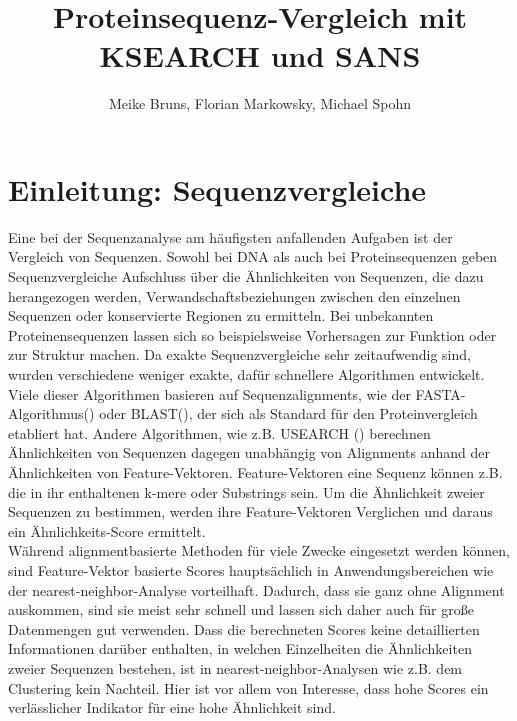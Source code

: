 \documentclass{article}
\title{Proteinsequenz-Vergleich mit KSEARCH und SANS}
\author{Meike Bruns, Florian Markowsky, Michael Spohn}
\begin{document}
\maketitle
\thispagestyle{empty}
\begin{abstract}
\end{abstract}
\newpage

\tableofcontents
\thispagestyle{empty}
\newpage

\section{Einleitung: Sequenzvergleiche}

Eine bei der Sequenzanalyse am häufigsten anfallenden Aufgaben ist der Vergleich von Sequenzen. Sowohl bei DNA als auch bei Proteinsequenzen geben Sequenzvergleiche Aufschluss über die Ähnlichkeiten von Sequenzen, die dazu herangezogen werden, Verwandschaftsbeziehungen zwischen den einzelnen Sequenzen oder konservierte Regionen zu ermitteln. Bei unbekannten Proteinensequenzen lassen sich so beispielsweise Vorhersagen zur Funktion oder zur Struktur machen. Da exakte Sequenzvergleiche sehr zeitaufwendig sind, wurden verschiedene weniger exakte, dafür schnellere Algorithmen entwickelt.\\
Viele dieser Algorithmen basieren auf Sequenzalignments, wie der FASTA-Algorithmus(\cite{FASTA}) oder BLAST(\cite{BLAST}), der sich als Standard für den Proteinvergleich etabliert hat.
Andere Algorithmen, wie z.B. USEARCH (\cite{USEARCH}) berechnen Ähnlichkeiten von Sequenzen dagegen unabhängig von Alignments anhand der Ähnlichkeiten von Feature-Vektoren. Feature-Vektoren eine Sequenz können z.B. die in ihr enthaltenen k-mere oder Substrings sein. Um die Ähnlichkeit zweier Sequenzen zu bestimmen, werden ihre Feature-Vektoren Verglichen und daraus ein Ähnlichkeits-Score ermittelt.\\
Während alignmentbasierte Methoden für viele Zwecke eingesetzt werden können, sind Feature-Vektor basierte Scores hauptsächlich in Anwendungsbereichen wie der nearest-neighbor-Analyse vorteilhaft. Dadurch, dass sie ganz ohne Alignment auskommen, sind sie meist sehr schnell und lassen sich daher auch für große Datenmengen gut verwenden. Dass die berechneten Scores keine detaillierten Informationen darüber enthalten, in welchen Einzelheiten die Ähnlichkeiten zweier Sequenzen bestehen, ist in nearest-neighbor-Analysen wie z.B. dem Clustering kein Nachteil. Hier ist vor allem von Interesse, dass hohe Scores ein verlässlicher Indikator für eine hohe Ähnlichkeit sind.\\
\end{document}

